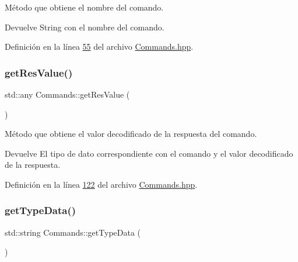 Método que obtiene el nombre del comando. 

\begin{DoxyReturn}{Devuelve}
String con el nombre del comando. 
\end{DoxyReturn}


Definición en la línea \hyperlink{Commands_8hpp_source_l00055}{55} del archivo \hyperlink{Commands_8hpp_source}{Commands.\+hpp}.

\mbox{\label{classCommands_a72801682a4ac2ba214b0ca0d4b85b974}} 
\subsubsection{\texorpdfstring{get\+Res\+Value()}{getResValue()}}
{\footnotesize\ttfamily std\+::any Commands\+::get\+Res\+Value (\begin{DoxyParamCaption}{ }\end{DoxyParamCaption})\hspace{0.3cm}{\ttfamily [inline]}}



Método que obtiene el valor decodificado de la respuesta del comando. 

\begin{DoxyReturn}{Devuelve}
El tipo de dato correspondiente con el comando y el valor decodificado de la respuesta. 
\end{DoxyReturn}


Definición en la línea \hyperlink{Commands_8hpp_source_l00122}{122} del archivo \hyperlink{Commands_8hpp_source}{Commands.\+hpp}.

\mbox{\label{classCommands_a7d983e153465d335db0b3ad7724b8ef6}} 
\subsubsection{\texorpdfstring{get\+Type\+Data()}{getTypeData()}}
{\footnotesize\ttfamily std\+::string Commands\+::get\+Type\+Data (\begin{DoxyParamCaption}{ }\end{DoxyParamCaption})\hspace{0.3cm}{\ttfamily [inline]}}



